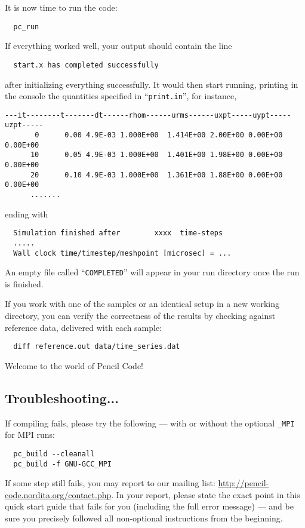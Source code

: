 \documentclass[a4paper,12pt]{article}
\newcommand{\command}[1]{\texttt{#1}}
\newcommand{\file}[1]{``\texttt{#1}''}
\newcommand{\name}[1]{\textsc{#1}}
\begin{document}
It is now time to run the code:
\begin{verbatim}
  pc_run
\end{verbatim}
If everything worked well, your output should contain the line
\begin{verbatim}
  start.x has completed successfully
\end{verbatim}
after initializing everything successfully. It would then start running,   
printing in the console the quantities specified in \file{print.in}, for 
instance,
\begin{verbatim}
---it--------t-------dt------rhom------urms------uxpt-----uypt-----uzpt-----
       0      0.00 4.9E-03 1.000E+00  1.414E+00 2.00E+00 0.00E+00 0.00E+00
      10      0.05 4.9E-03 1.000E+00  1.401E+00 1.98E+00 0.00E+00 0.00E+00
      20      0.10 4.9E-03 1.000E+00  1.361E+00 1.88E+00 0.00E+00 0.00E+00 
      .......
\end{verbatim}
ending with
\begin{verbatim}
  Simulation finished after        xxxx  time-steps
  .....
  Wall clock time/timestep/meshpoint [microsec] = ...
\end{verbatim}
An empty file called \file{COMPLETED} will appear in your run directory once 
the run is finished.


If you work with one of the samples or an identical setup in a new working directory, you can verify the correctness of the results
by checking against reference data, delivered with each sample:
\begin{verbatim}
  diff reference.out data/time_series.dat
\end{verbatim}

Welcome to the world of Pencil Code!

\subsection{Troubleshooting...}

If compiling fails, please try the following --- with or without the optional \command{\_MPI} for \name{MPI} runs:
\begin{verbatim}
  pc_build --cleanall
  pc_build -f GNU-GCC_MPI
\end{verbatim}

If some step still fails, you may report to our mailing list: \url{http://pencil-code.nordita.org/contact.php}.
In your report, please state the exact point in this quick start guide that fails for you (including the full error message) --- and be sure you precisely followed all non-optional instructions from the beginning.
\end{document}
